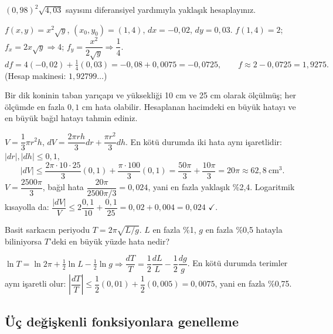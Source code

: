 \begin{soru}
$(0{,}98)^2\sqrt{4{,}03}$ sayısını diferansiyel yardımıyla yaklaşık hesaplayınız.
\end{soru}
\begin{cevap}
$f(x,y)=x^2\sqrt y$, $(x_0,y_0)=(1,4)$, $dx=-0{,}02$, $dy=0{,}03$. $f(1,4)=2$;
$f_x=2x\sqrt y\Rightarrow4$; $f_y=\dfrac{x^2}{2\sqrt y}\Rightarrow\dfrac14$.
\[ df=4(-0{,}02)+\tfrac14(0{,}03)=-0{,}08+0{,}0075=-0{,}0725,\qquad f\approx2-0{,}0725=1{,}9275 . \]
(Hesap makinesi: $1{,}92799\ldots$)
\end{cevap}

\begin{soru}
Bir dik koninin taban yarıçapı ve yüksekliği 10 cm ve 25 cm olarak ölçülmüş; her ölçümde en fazla $0{,}1$ cm hata
olabilir. Hesaplanan hacimdeki en büyük hatayı ve en büyük bağıl hatayı tahmin ediniz.
\end{soru}
\begin{cevap}
$V=\dfrac13\pi r^2h$, $dV=\dfrac{2\pi rh}{3}dr+\dfrac{\pi r^2}{3}dh$. En kötü durumda iki hata aynı işaretlidir:
$|dr|,|dh|\le0{,}1$,
\[
|dV|\le\frac{2\pi\cdot10\cdot25}{3}(0{,}1)+\frac{\pi\cdot100}{3}(0{,}1)=\frac{50\pi}{3}+\frac{10\pi}{3}=20\pi\approx62{,}8\ \text{cm}^3 .
\]
$V=\dfrac{2500\pi}{3}$, bağıl hata $\dfrac{20\pi}{2500\pi/3}=0{,}024$, yani en fazla yaklaşık \%2,4.
Logaritmik kısayolla da: $\dfrac{|dV|}{V}\le2\dfrac{0{,}1}{10}+\dfrac{0{,}1}{25}=0{,}02+0{,}004=0{,}024$ $\checkmark$.
\end{cevap}

\begin{soru}
Basit sarkacın periyodu $T=2\pi\sqrt{L/g}$. $L$ en fazla \%1, $g$ en fazla \%0,5 hatayla biliniyorsa $T$'deki en büyük
yüzde hata nedir?
\end{soru}
\begin{cevap}
$\ln T=\ln2\pi+\tfrac12\ln L-\tfrac12\ln g\Rightarrow \dfrac{dT}{T}=\dfrac12\dfrac{dL}{L}-\dfrac12\dfrac{dg}{g}$.
En kötü durumda terimler aynı işaretli olur:
$\left|\dfrac{dT}{T}\right|\le\dfrac12(0{,}01)+\dfrac12(0{,}005)=0{,}0075$, yani en fazla \%0,75.
\end{cevap}

\subsection{Üç değişkenli fonksiyonlara genelleme}

